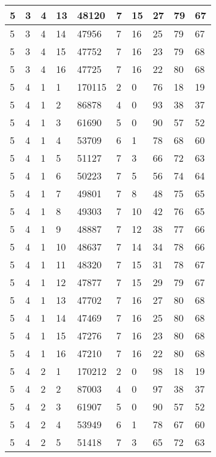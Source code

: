 \begin{table}[!ht]
\begin{tabular}{|l|l|l|l|l|l|l|l|l|l|}
        5 & 3 & 4 & 13 & 48120 & 7 & 15 & 27 & 79 & 67 \\ \hline
        5 & 3 & 4 & 14 & 47956 & 7 & 16 & 25 & 79 & 67 \\ \hline
        5 & 3 & 4 & 15 & 47752 & 7 & 16 & 23 & 79 & 68 \\ \hline
        5 & 3 & 4 & 16 & 47725 & 7 & 16 & 22 & 80 & 68 \\ \hline
        5 & 4 & 1 & 1 & 170115 & 2 & 0 & 76 & 18 & 19 \\ \hline
        5 & 4 & 1 & 2 & 86878 & 4 & 0 & 93 & 38 & 37 \\ \hline
        5 & 4 & 1 & 3 & 61690 & 5 & 0 & 90 & 57 & 52 \\ \hline
        5 & 4 & 1 & 4 & 53709 & 6 & 1 & 78 & 68 & 60 \\ \hline
        5 & 4 & 1 & 5 & 51127 & 7 & 3 & 66 & 72 & 63 \\ \hline
        5 & 4 & 1 & 6 & 50223 & 7 & 5 & 56 & 74 & 64 \\ \hline
        5 & 4 & 1 & 7 & 49801 & 7 & 8 & 48 & 75 & 65 \\ \hline
        5 & 4 & 1 & 8 & 49303 & 7 & 10 & 42 & 76 & 65 \\ \hline
        5 & 4 & 1 & 9 & 48887 & 7 & 12 & 38 & 77 & 66 \\ \hline
        5 & 4 & 1 & 10 & 48637 & 7 & 14 & 34 & 78 & 66 \\ \hline
        5 & 4 & 1 & 11 & 48320 & 7 & 15 & 31 & 78 & 67 \\ \hline
        5 & 4 & 1 & 12 & 47877 & 7 & 15 & 29 & 79 & 67 \\ \hline
        5 & 4 & 1 & 13 & 47702 & 7 & 16 & 27 & 80 & 68 \\ \hline
        5 & 4 & 1 & 14 & 47469 & 7 & 16 & 25 & 80 & 68 \\ \hline
        5 & 4 & 1 & 15 & 47276 & 7 & 16 & 23 & 80 & 68 \\ \hline
        5 & 4 & 1 & 16 & 47210 & 7 & 16 & 22 & 80 & 68 \\ \hline
        5 & 4 & 2 & 1 & 170212 & 2 & 0 & 98 & 18 & 19 \\ \hline
        5 & 4 & 2 & 2 & 87003 & 4 & 0 & 97 & 38 & 37 \\ \hline
        5 & 4 & 2 & 3 & 61907 & 5 & 0 & 90 & 57 & 52 \\ \hline
        5 & 4 & 2 & 4 & 53949 & 6 & 1 & 78 & 67 & 60 \\ \hline
        5 & 4 & 2 & 5 & 51418 & 7 & 3 & 65 & 72 & 63 \\ \hline

\end{tabular}
\end{table}
